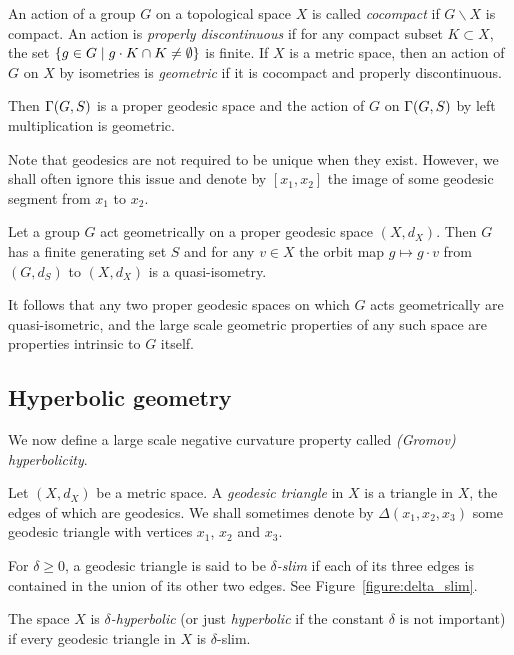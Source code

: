 \begin{definition}\label{definition:geometric_actions}
  An action of a group $G$ on a topological space $X$ is called \emph{cocompact} if $G\backslash X$ is compact.
  An action is \emph{properly discontinuous} if for any compact subset $K \subset X$, the set $\{g \in G \mid g\cdot K \cap K \neq \emptyset\}$ is finite.
  If $X$ is a metric space, then an action of $G$ on $X$ by isometries is \emph{geometric} if it is cocompact and properly discontinuous.
\end{definition}

Then $\operatorname{\Gamma}(G, S)$ is a proper geodesic space and the action of $G$ on $\operatorname{\Gamma}(G, S)$ by left multiplication is geometric.

\begin{remark}
  Note that geodesics are not required to be unique when they exist.
  However, we shall often ignore this issue and denote by $[x_1,x_2]$ the image of some geodesic segment from $x_1$ to $x_2$.
\end{remark}

\begin{theorem}
  \label{theorem:svarc_milnor}
  Let a group $G$ act geometrically on a proper geodesic space $(X,d_X)$. 
  Then $G$ has a finite generating set $S$ and for any $v \in X$ the orbit map $g \mapsto g\cdot v$ from $(G, d_S)$ to $(X, d_X)$ is a quasi-isometry.
\end{theorem}

It follows that any two proper geodesic spaces on which $G$ acts geometrically are quasi-isometric, and the large scale geometric properties of any such space are properties intrinsic to $G$ itself.

\subsection{Hyperbolic geometry}

We now define a large scale negative curvature property called \emph{(Gromov) hyperbolicity}.

\begin{definition}\cite{gromov87}\label{definition:slim_triangles}
  Let $(X, d_X)$ be a metric space.
  A \emph{geodesic triangle} in $X$ is a triangle in $X$, the edges of which are geodesics.
  We shall sometimes denote by $\Delta(x_1, x_2, x_3)$ some geodesic triangle with vertices $x_1$, $x_2$ and $x_3$.

  For $\delta \geq 0$, a geodesic triangle is said to be \emph{$\delta$-slim} if each of its three edges is contained in the union of its other two edges.
  See Figure~\ref{figure:delta_slim}.

  The space $X$ is \emph{$\delta$-hyperbolic} (or just \emph{hyperbolic} if the constant $\delta$ is not important) if every geodesic triangle in $X$ is $\delta$-slim.
\end{definition}

